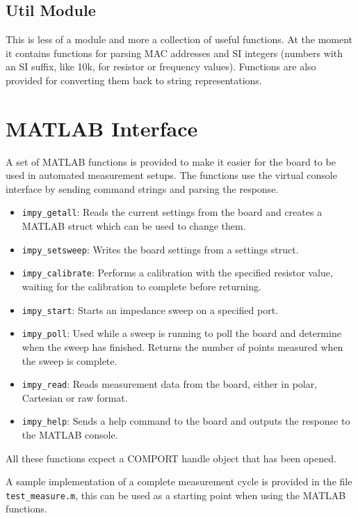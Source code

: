 

\subsection{Util Module}

This is less of a module and more a collection of useful functions. At the moment it contains functions for parsing
MAC addresses and SI integers (numbers with an SI suffix, like 10k, for resistor or frequency values). Functions
are also provided for converting them back to string representations.


\clearpage
\section{MATLAB Interface}

A set of MATLAB functions is provided to make it easier for the board to be used in automated measurement setups.
The functions use the virtual console interface by sending command strings and parsing the response.
%
\begin{itemize}
	\item \verb!impy_getall!: Reads the current settings from the board and creates a MATLAB struct which can be used to
    change them.
  \item \verb!impy_setsweep!: Writes the board settings from a settings struct.
  \item \verb!impy_calibrate!: Performs a calibration with the specified resistor value, waiting for the calibration to
    complete before returning.
  \item \verb!impy_start!: Starts an impedance sweep on a specified port.
  \item \verb!impy_poll!: Used while a sweep is running to poll the board and determine when the sweep has finished.
    Returns the number of points measured when the sweep is complete.
  \item \verb!impy_read!: Reads measurement data from the board, either in polar, Cartesian or raw format.
  \item \verb!impy_help!: Sends a help command to the board and outputs the response to the MATLAB console.
\end{itemize}

All these functions expect a COMPORT handle object that has been opened.

A sample implementation of a complete measurement cycle is provided in the file \verb!test_measure.m!, this can be used
as a starting point when using the MATLAB functions.

